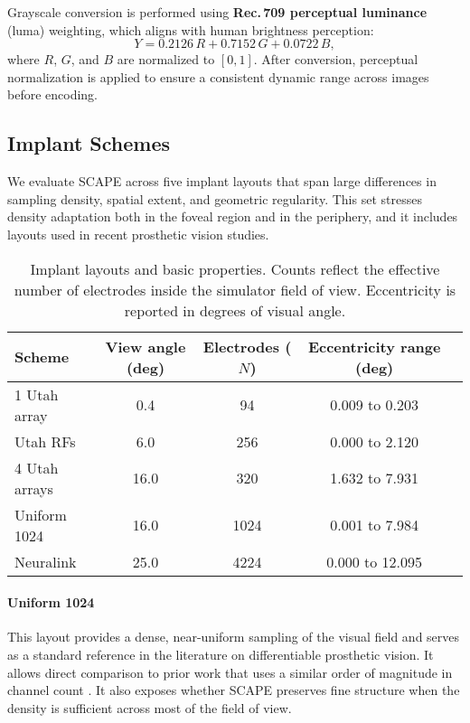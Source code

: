 Grayscale conversion is performed using \textbf{Rec.\,709 perceptual luminance} (luma) weighting, which aligns with human brightness perception:
\begin{equation}
Y = 0.2126\,R + 0.7152\,G + 0.0722\,B,
\end{equation}
where $R$, $G$, and $B$ are normalized to $[0,1]$.  
After conversion, perceptual normalization is applied to ensure a consistent dynamic range across images before encoding.



\subsection{Implant Schemes}
We evaluate SCAPE across five implant layouts that span large differences in sampling density, spatial extent, and geometric regularity. This set stresses density adaptation both in the foveal region and in the periphery, and it includes layouts used in recent prosthetic vision studies.

\begin{table*}[t]
\centering
\begin{tabular}{lcccc}
\toprule
Scheme & View angle (deg) & Electrodes ($N$) & Eccentricity range (deg) \\
\midrule
1 Utah array & 0.4  & 94   & 0.009 to 0.203 \\
Utah RFs     & 6.0  & 256  & 0.000 to 2.120 \\
4 Utah arrays & 16.0 & 320  & 1.632 to 7.931 \\
Uniform 1024 & 16.0 & 1024 & 0.001 to 7.984 \\
Neuralink    & 25.0 & 4224 & 0.000 to 12.095 \\
\bottomrule
\end{tabular}
\caption{Implant layouts and basic properties. Counts reflect the effective number of electrodes inside the simulator field of view. Eccentricity is reported in degrees of visual angle.}
\label{tab:implant_schemes}
\end{table*}

\paragraph{Uniform 1024}
This layout provides a dense, near-uniform sampling of the visual field and serves as a standard reference in the literature on differentiable prosthetic vision. It allows direct comparison to prior work that uses a similar order of magnitude in channel count \cite{deRuytervanSteveninck2020}. It also exposes whether SCAPE preserves fine structure when the density is sufficient across most of the field of view.

